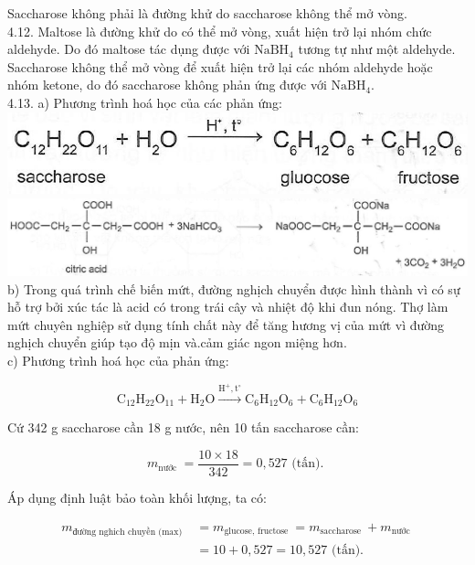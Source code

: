 \documentclass[10pt]{article}
\begin{document}
Saccharose không phải là đường khử do saccharose không thể mở vòng.\\
4.12. Maltose là đường khử do có thể mở vòng, xuất hiện trở lại nhóm chức aldehyde. Do đó maltose tác dụng được với $\mathrm{NaBH}_{4}$ tương tự như một aldehyde. Saccharose không thể mở vòng để xuất hiện trở lại các nhóm aldehyde hoặc nhóm ketone, do đó saccharose không phản ứng được với $\mathrm{NaBH}_{4}$.\\
4.13. a) Phương trình hoá học của các phản ứng:\\
\includegraphics[max width=\textwidth, center]{2025_10_23_b4e16b74380d0f7e7700g-030}\\
\includegraphics[max width=\textwidth, center]{2025_10_23_b4e16b74380d0f7e7700g-030(1)}\\
b) Trong quá trình chế biến mứt, đường nghịch chuyển được hình thành vì có sự hỗ trợ bởi xúc tác là acid có trong trái cây và nhiệt độ khi đun nóng. Thợ làm mứt chuyên nghiệp sử dụng tính chất này để tăng hương vị của mứt vì đường nghịch chuyển giúp tạo độ mịn và.cảm giác ngon miệng hơn.\\
c) Phương trình hoá học của phản ứng:

$$
\mathrm{C}_{12} \mathrm{H}_{22} \mathrm{O}_{11}+\mathrm{H}_{2} \mathrm{O} \xrightarrow{\mathrm{H}^{+}, \mathrm{t}^{\circ}} \mathrm{C}_{6} \mathrm{H}_{12} \mathrm{O}_{6}+\mathrm{C}_{6} \mathrm{H}_{12} \mathrm{O}_{6}
$$

Cứ 342 g saccharose cần 18 g nước, nên 10 tấn saccharose cần:

$$
m_{\text {nước }}=\frac{10 \times 18}{342}=0,527 \text { (tấn). }
$$

Áp dụng định luật bảo toàn khối lượng, ta có:

$$
\begin{aligned}
m_{\text {đường nghich chuyền (max) }} & =m_{\text {glucose, fructose }}=m_{\text {saccharose }}+m_{\text {nước }} \\
& =10+0,527=10,527 \text { (tấn). }
\end{aligned}
$$
\end{document}
